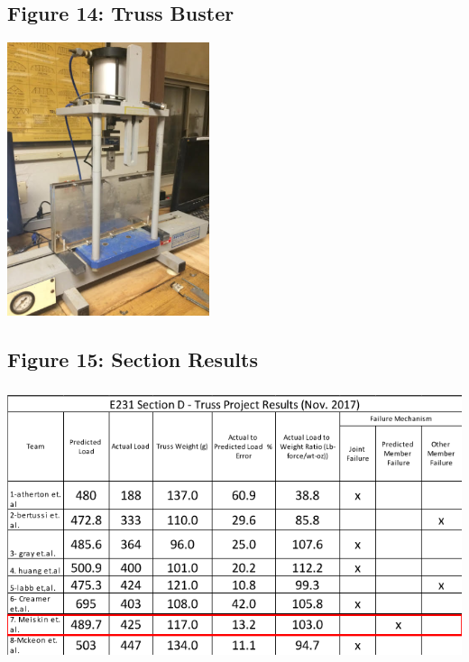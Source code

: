 \documentclass{article}
\begin{document}
\subsection{Figure 14: Truss Buster}
\begin{center}{\includegraphics[height=8cm]{TrussBuster.png}}\end{center}

\subsection{Figure 15: Section Results}
\begin{center}{\includegraphics[height=8cm]{TrussResults.png}}\end{center}
\end{document}
